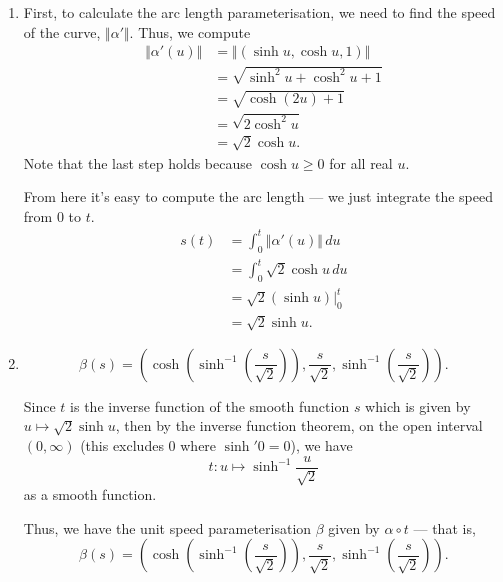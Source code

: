 \documentclass[12 pt, letterpaper]{hmcpset}
\begin{document}
\begin{solution}
	\begin{enumerate}
		\item First, to calculate the arc length parameterisation, we need to find the speed of the curve, $\Vert \alpha' \Vert$. Thus, we compute
			\[
				\begin{split}
					\Vert \alpha'(u) \Vert & = \Vert (\sinh{u}, \cosh{u}, 1) \Vert \\
							       & = \sqrt{\sinh^{2}{u} + \cosh^{2}{u} + 1} \\
							       & = \sqrt{\cosh(2u) + 1} \\
							       & = \sqrt{2 \cosh^{2}{u}} \\
							       & = \sqrt 2 \cosh u.
				\end{split}
			\]
			Note that the last step holds because $\cosh{u} \ge 0$ for all real $u$. 

			From here it's easy to compute the arc length --- we just integrate the speed from $0$ to $t$.
			\[
				\begin{split}
					s(t) & = \int_{0}^{t} \Vert \alpha'(u) \Vert \, du \\
					     & = \int_{0}^{t} \sqrt 2 \cosh{u} \, du \\
					     & = \sqrt 2 \left ( \sinh{u} \right )\Big |_{0}^{t} \\
					     & = \sqrt 2 \sinh{u}.
				\end{split}
			\]
	\item
		\[
			\boxed{
				\beta(s) = \left ( \cosh \left ( \sinh^{-1} \left ( {\frac{s}{\sqrt 2}} \right ) \right ), \frac{s}{\sqrt 2}, \sinh^{-1} \left ( \frac{s}{\sqrt 2} \right ) \right ).
			}
		\]

		Since $t$ is the inverse function of the smooth function $s$ which is given by $u \mapsto \sqrt 2 \sinh{u}$, then by the inverse function theorem, on the open interval $(0, \infty)$ (this excludes $0$ where $\sinh'{0} = 0$), we have
		\[
			t : u \mapsto \sinh^{-1}{\frac{u}{\sqrt 2}}
		\]
		as a smooth function. 

		Thus, we have the unit speed parameterisation $\beta$ given by $\alpha \circ t$ --- that is,
		\[
			\beta(s) = \left ( \cosh \left ( \sinh^{-1} \left ( {\frac{s}{\sqrt 2}} \right ) \right ), \frac{s}{\sqrt 2}, \sinh^{-1} \left ( \frac{s}{\sqrt 2} \right ) \right ).
		\]
	\end{enumerate}
\end{solution}

\pagebreak
\end{document}
